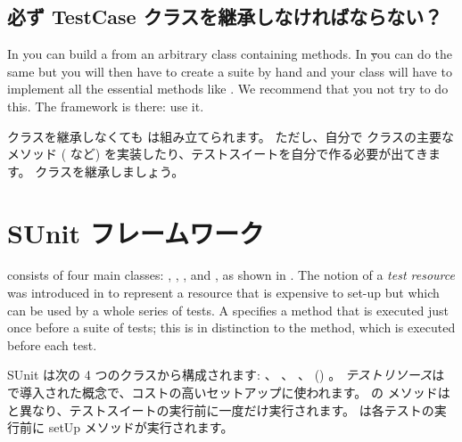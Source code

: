 \documentclass[a4paper,10pt,twoside]{book}
\begin{document}
{%

\subsection{必ず TestCase クラスを継承しなければならない？}

In \JUnit{} you can build a  from an arbitrary class
containing  methods.  In \st you can do the same
but you will then have to create a suite by hand and your class will
have to implement all the essential  methods like .
We recommend that you not try to do this.  The framework is there: use it.
\fi

 クラスを継承しなくても  は組み立てられます。
ただし、自分で  クラスの主要なメソッド ( など) を実装したり、テストスイートを自分で作る必要が出てきます。
 クラスを継承しましょう。


\section{SUnit フレームワーク}

\sunit consists of four main classes: ,
, , and , as shown in .
The notion of a \emph{test resource} was introduced in  to represent a resource that is expensive to set-up but which can be used by
a whole series of tests.  A 
specifies a  method that is executed just once before a suite of tests;
this is in distinction to the  method, which is executed before
each test.
\fi

SUnit は次の 4 つのクラスから構成されます:  、
 、  、  () 。
\emph{テストリソース}は  で導入された概念で、コストの高いセットアップに使われます。
 の  メソッドは  と異なり、テストスイートの実行前に一度だけ実行されます。  は各テストの実行前に setUp メソッドが実行されます。

}
\end{document}
